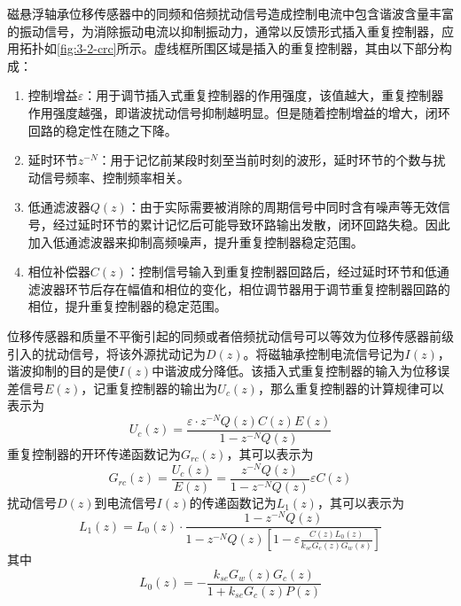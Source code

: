 \documentclass[
  lang=cn,
  degree=master,
  openany,oneside
]{nuaathesis}
\begin{document}
磁悬浮轴承位移传感器中的同频和倍频扰动信号造成控制电流中包含谐波含量丰富的振动信号，为消除振动电流以抑制振动力，通常以反馈形式插入重复控制器，应用拓扑如\autoref{fig:3-2-crc}所示。虚线框所围区域是插入的重复控制器，其由以下部分构成：
\begin{enumerate}
	\item 控制增益$\varepsilon $：用于调节插入式重复控制器的作用强度，该值越大，重复控制器作用强度越强，即谐波扰动信号抑制越明显。但是随着控制增益的增大，闭环回路的稳定性在随之下降。
	\item 延时环节${z^{ - N}}$：用于记忆前某段时刻至当前时刻的波形，延时环节的个数与扰动信号频率、控制频率相关。
	\item 低通滤波器$Q(z)$：由于实际需要被消除的周期信号中同时含有噪声等无效信号，经过延时环节的累计记忆后可能导致环路输出发散，闭环回路失稳。因此加入低通滤波器来抑制高频噪声，提升重复控制器稳定范围。
	\item 相位补偿器$C(z)$：控制信号输入到重复控制器回路后，经过延时环节和低通滤波器环节后存在幅值和相位的变化，相位调节器用于调节重复控制器回路的相位，提升重复控制器的稳定范围。
\end{enumerate}

位移传感器和质量不平衡引起的同频或者倍频扰动信号可以等效为位移传感器前级引入的扰动信号，将该外源扰动记为$D(z)$。将磁轴承控制电流信号记为$I(z)$，谐波抑制的目的是使$I(z)$中谐波成分降低。该插入式重复控制器的输入为位移误差信号$E(z)$，记重复控制器的输出为$U_c(z)$，那么重复控制器的计算规律可以表示为
\begin{equation}
{U_c}\left( z \right) = \frac{{\varepsilon  \cdot {z^{ - N}}Q\left( z \right)C\left( z \right)E\left( z \right)}}{{1 - {z^{ - N}}Q\left( z \right)}}
\label{eq3-3}
\end{equation}
重复控制器的开环传递函数记为$G_{rc}(z)$，其可以表示为
\begin{equation}
{G_{rc}}\left( z \right) = \frac{{{U_c}\left( z \right)}}{{E\left( z \right)}} = \frac{{{z^{ - N}}Q\left( z \right)}}{{1 - {z^{ - N}}Q\left( z \right)}}\varepsilon C\left( z \right)
\label{eq3-4}
\end{equation}
扰动信号$D(z)$到电流信号$I(z)$的传递函数记为$L_1(z)$，其可以表示为
\begin{equation}
{L_1}\left( z \right) = {L_0}\left( z \right) \cdot \frac{{1 - {z^{ - N}}Q\left( z \right)}}{{1 - {z^{ - N}}Q\left( z \right)\left[ {1 - \varepsilon \frac{{C\left( z \right){L_0}\left( z \right)}}{{{k_{se}}{G_c}\left( z \right){G_w}\left( s \right)}}} \right]}}
\label{eq3-5}
\end{equation}
其中
\begin{equation}
{L_0}\left( z \right) =  - \frac{{{k_{se}}{G_w}\left( z \right){G_c}\left( z \right)}}{{1 + {k_{se}}{G_c}\left( z \right)P\left( z \right)}}
\label{eq3-6}
\end{equation}
\end{document}
